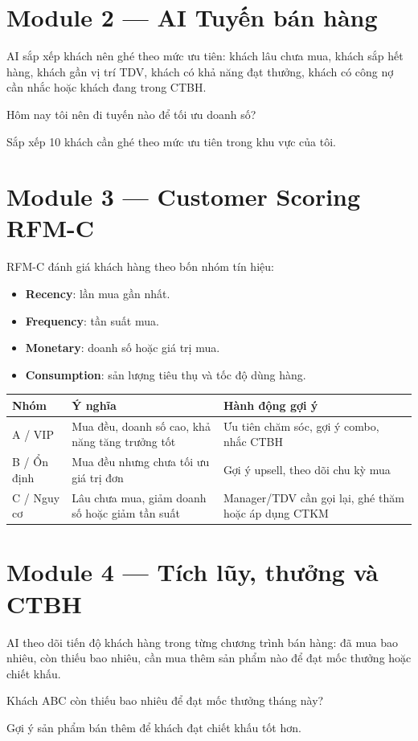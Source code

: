 \documentclass[12pt,a4paper,oneside,openany]{book}
\newcommand{\prompt}[1]{\begin{tcolorbox}[codeBox]#1\end{tcolorbox}}
\begin{document}
\section{Module 2 — AI Tuyến bán hàng}
AI sắp xếp khách nên ghé theo mức ưu tiên: khách lâu chưa mua, khách sắp hết hàng, khách gần vị trí TDV, khách có khả năng đạt thưởng, khách có công nợ cần nhắc hoặc khách đang trong CTBH.

\prompt{Hôm nay tôi nên đi tuyến nào để tối ưu doanh số?}
\prompt{Sắp xếp 10 khách cần ghé theo mức ưu tiên trong khu vực của tôi.}

\section{Module 3 — Customer Scoring RFM-C}
RFM-C đánh giá khách hàng theo bốn nhóm tín hiệu:
\begin{itemize}
  \item \textbf{Recency}: lần mua gần nhất.
  \item \textbf{Frequency}: tần suất mua.
  \item \textbf{Monetary}: doanh số hoặc giá trị mua.
  \item \textbf{Consumption}: sản lượng tiêu thụ và tốc độ dùng hàng.
\end{itemize}

\begin{longtable}{p{3cm}p{5cm}p{6cm}}
\toprule
\textbf{Nhóm} & \textbf{Ý nghĩa} & \textbf{Hành động gợi ý} \\
\midrule
A / VIP & Mua đều, doanh số cao, khả năng tăng trưởng tốt & Ưu tiên chăm sóc, gợi ý combo, nhắc CTBH \\
B / Ổn định & Mua đều nhưng chưa tối ưu giá trị đơn & Gợi ý upsell, theo dõi chu kỳ mua \\
C / Nguy cơ & Lâu chưa mua, giảm doanh số hoặc giảm tần suất & Manager/TDV cần gọi lại, ghé thăm hoặc áp dụng CTKM \\
\bottomrule
\end{longtable}

\section{Module 4 — Tích lũy, thưởng và CTBH}
AI theo dõi tiến độ khách hàng trong từng chương trình bán hàng: đã mua bao nhiêu, còn thiếu bao nhiêu, cần mua thêm sản phẩm nào để đạt mốc thưởng hoặc chiết khấu.

\prompt{Khách ABC còn thiếu bao nhiêu để đạt mốc thưởng tháng này?}
\prompt{Gợi ý sản phẩm bán thêm để khách đạt chiết khấu tốt hơn.}
\end{document}
